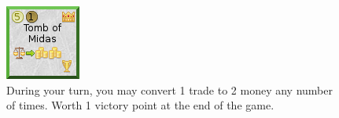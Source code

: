 \documentclass[11pt,a4paper,titlepage]{article}
\begin{document}
{  \begin{figure}[!htb]
    \begin{minipage}[c]{0.1\textwidth}
      \includegraphics[scale=.7]{doe_wonder_tomb_of_midas.png}
    \end{minipage}\hfill
    \begin{minipage}[c]{0.6\textwidth}
      \captionsetup{labelformat=empty, justification=justified, singlelinecheck=false}
      \caption{During your turn, you may convert 1 trade to 2 money any number of times. Worth 1 victory point at the end of the game.}
    \end{minipage}\hfill
    \label{fig:wonder_tomb_of_midas}
  \end{figure}

}\label{sec:wonder_tiles}
\end{document}
